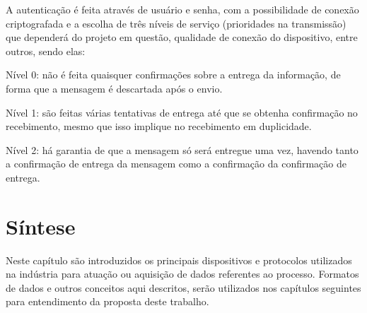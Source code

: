         \begin{figure}[!h]
	    \end{figure}
	    \newpage
	    A autenticação é feita através de usuário e senha, com a possibilidade de conexão criptografada e a escolha de três níveis de serviço (prioridades na transmissão) que dependerá do projeto em questão, qualidade de conexão do dispositivo, entre outros, sendo elas: 
	    
        \begin{alineascomponto}
        	\item Nível 0: não é feita quaisquer confirmações sobre a entrega da informação, de forma que a mensagem é descartada após o envio.
        	\item Nível 1: são feitas várias tentativas de entrega até que se obtenha confirmação no recebimento, mesmo que isso implique no recebimento em duplicidade.
        	\item Nível 2: há garantia de que a mensagem só será entregue uma vez, havendo tanto a confirmação de entrega da mensagem como a confirmação da confirmação de entrega.
        \end{alineascomponto}

\section{Síntese}
\label{sec:sintese-dispositivos-protocolos}

Neste capítulo são introduzidos os principais dispositivos e protocolos utilizados na indústria para atuação ou aquisição de dados referentes ao processo. Formatos de dados e outros conceitos aqui descritos, serão utilizados nos capítulos seguintes para entendimento da proposta deste trabalho.